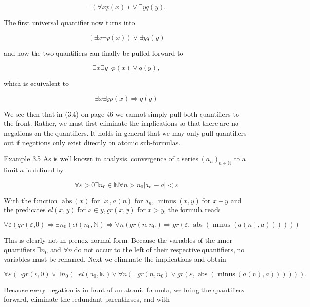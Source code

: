\documentclass[10pt]{book}
\begin{document}
$$
\neg(\forall x p(x)) \vee \exists y q(y) .
$$

The first universal quantifier now turns into

$$
(\exists x \neg p(x)) \vee \exists y q(y)
$$

and now the two quantifiers can finally be pulled forward to

$$
\exists x \exists y \neg p(x) \vee q(y),
$$

which is equivalent to

$$
\exists x \exists y p(x) \Rightarrow q(y)
$$

We see then that in (3.4) on page 46 we cannot simply pull both quantifiers to the front. Rather, we must first eliminate the implications so that there are no negations on the quantifiers. It holds in general that we may only pull quantifiers out if negations only exist directly on atomic sub-formulas.

Example 3.5 As is well known in analysis, convergence of a series $\left(a_{n}\right)_{n \in \mathbb{N}}$ to a limit $a$ is defined by

$$
\forall \varepsilon>0 \exists n_{0} \in \mathbb{N} \forall n>n_{0}\left|a_{n}-a\right|<\varepsilon
$$

With the function $\operatorname{abs}(x)$ for $|x|, a(n)$ for $a_{n}$, $\operatorname{minus}(x, y)$ for $x-y$ and the predicates $e l(x, y)$ for $x \in y, g r(x, y)$ for $x>y$, the formula reads

\begin{equation*}
\forall \varepsilon\left(g r(\varepsilon, 0) \Rightarrow \exists n_{0}\left(e l\left(n_{0}, \mathbb{N}\right) \Rightarrow \forall n\left(g r\left(n, n_{0}\right) \Rightarrow g r(\varepsilon, \operatorname{abs}(\operatorname{minus}(a(n), a)))\right)\right)\right) \tag{3.5}
\end{equation*}

This is clearly not in prenex normal form. Because the variables of the inner quantifiers $\exists n_{0}$ and $\forall n$ do not occur to the left of their respective quantifiers, no variables must be renamed. Next we eliminate the implications and obtain

$$
\forall \varepsilon\left(\neg g r(\varepsilon, 0) \vee \exists n_{0}\left(\neg e l\left(n_{0}, \mathbb{N}\right) \vee \forall n\left(\neg g r\left(n, n_{0}\right) \vee g r(\varepsilon, \operatorname{abs}(\operatorname{minus}(a(n), a)))\right)\right)\right) .
$$

Because every negation is in front of an atomic formula, we bring the quantifiers forward, eliminate the redundant parentheses, and with
\end{document}
